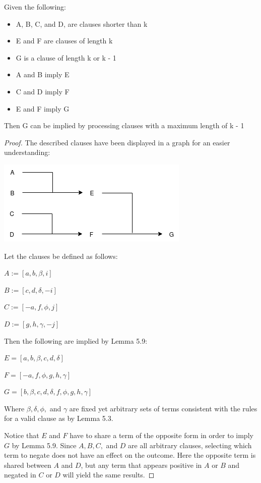 \documentclass[manuscript]{acmart}
\begin{document}
    \begin{lemma}
        Given the following:
        \begin{itemize}
            \item A, B, C, and D, are clauses shorter than k
            \item E and F are clauses of length k
            \item G is a clause of length k or k - 1
            \item A and B imply E
            \item C and D imply F
            \item E and F imply G
        \end{itemize}
        Then G can be implied by processing clauses with a maximum length of k - 1
    \end{lemma}
    \begin{proof}
        The described clauses have been displayed in a graph for an easier understanding:

        \includegraphics[scale=0.8]{517a.png}

        Let the clauses be defined as follows:

        $A := [a, b, \beta, i]$

        $B := [c, d, \delta, -i]$
        
        $C := [-a, f, \phi, j]$
        
        $D := [g, h, \gamma, -j]$

        Then the following are implied by Lemma 5.9:

        $E = [a, b, \beta, c, d, \delta]$
        
        $F = [-a, f, \phi, g, h, \gamma]$
        
        $G = [b, \beta, c, d, \delta, f, \phi, g, h, \gamma]$
        
        Where $\beta, \delta, \phi,$ and $\gamma$ are fixed yet arbitrary sets
        of terms consistent with the rules for a valid clause as by Lemma 5.3.

        Notice that $E$ and $F$ have to share a term of the opposite form
        in order to imply $G$ by Lemma 5.9. Since $A, B, C,$ and $D$ are
        all arbitrary clauses, selecting which term to negate does not
        have an effect on the outcome. Here the opposite term is shared 
        between $A$ and $D$, but any term that appears positive in $A$
        or $B$ and negated in $C$ or $D$ will yield the same results.
 

\end{proof}
\end{document}
